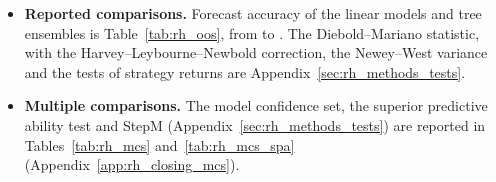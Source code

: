 \begin{itemize}
\item \textbf{Reported comparisons.} Forecast accuracy of the linear models and tree ensembles is Table~\ref{tab:rh_oos}, from \rhorSpanStart{} to \rhorSpanEnd.
  The Diebold--Mariano statistic, with the Harvey--Leybourne--Newbold correction, the Newey--West variance and the
  tests of strategy returns are Appendix~\ref{sec:rh_methods_tests}.
\item \textbf{Multiple comparisons.} The model confidence set, the superior predictive ability test and StepM
  (Appendix~\ref{sec:rh_methods_tests}) are reported in Tables~\ref{tab:rh_mcs} and~\ref{tab:rh_mcs_spa}
  (Appendix~\ref{app:rh_closing_mcs}).

\end{itemize}
